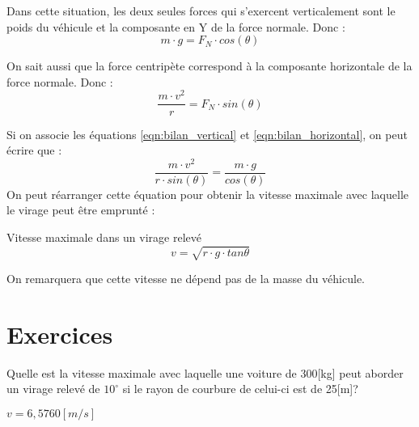 \begin{tcolorbox}[title={Réalise, ci-dessous, un schéma \enquote{vue de haut} et \enquote{vue en coupe} des forces agissant sur une voiture dans un virage relevé.},sidebyside,height=6cm]

    \tcblower

\end{tcolorbox}

\newpage

Dans cette situation, les deux seules forces qui s'exercent verticalement sont le poids du véhicule et la composante en Y de la force normale. Donc :
\begin{equation}
    m \cdot g = F_N \cdot cos(\theta)
    \label{eqn:bilan_vertical}
\end{equation}

On sait aussi que la force centripète correspond à la composante horizontale de la force normale. Donc :
\begin{equation}
    \frac{m \cdot v^2}{r} = F_N \cdot sin(\theta)
    \label{eqn:bilan_horizontal}
\end{equation}

Si on associe les équations \ref{eqn:bilan_vertical} et \ref{eqn:bilan_horizontal}, on peut écrire que :
\begin{equation}
    \frac{m \cdot v^2}{r \cdot sin(\theta)} = \frac{m \cdot g}{cos(\theta)}
\end{equation}
On peut réarranger cette équation pour obtenir la vitesse maximale avec laquelle le virage peut être emprunté :
\begin{mytheo*}{Vitesse maximale dans un virage relevé}
    \begin{equation}
        v=\sqrt{r \cdot g \cdot tan \theta}
    \end{equation}
\end{mytheo*}
On remarquera que cette vitesse ne dépend pas de la masse du véhicule.

\newpage

\section{Exercices}
\begin{exercise}%
    Quelle est la vitesse maximale avec laquelle une voiture de 300[kg] peut aborder un virage relevé de \(10^{\circ}\) si le rayon de courbure de celui-ci est de 25[m]?
\end{exercise}
\begin{solution}%
    \(v=6,5760[m/s]\)
\end{solution}


